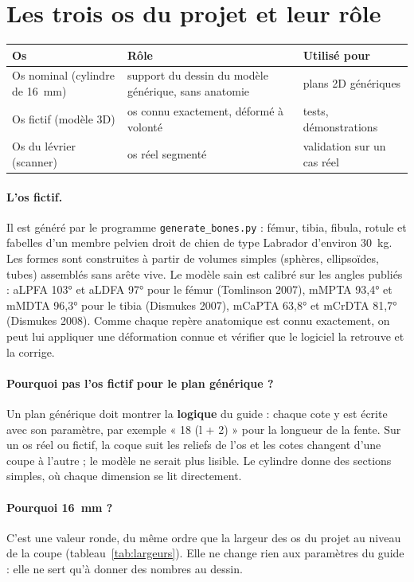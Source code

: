 \documentclass[11pt,a4paper]{article}
\begin{document}
\section{Les trois os du projet et leur rôle}

\begin{tabularx}{\textwidth}{@{}lXl@{}}
\toprule
\textbf{Os} & \textbf{Rôle} & \textbf{Utilisé pour} \\ \midrule
Os nominal (cylindre de 16~mm) & support du dessin du modèle générique, sans anatomie & plans 2D génériques \\
Os fictif (modèle 3D) & os connu exactement, déformé à volonté & tests, démonstrations \\
Os du lévrier (scanner) & os réel segmenté & validation sur un cas réel \\
\bottomrule
\end{tabularx}

\paragraph{L'os fictif.} Il est généré par le programme \texttt{generate\_bones.py} : fémur, tibia, fibula, rotule et
fabelles d'un membre pelvien droit de chien de type Labrador d'environ 30~kg. Les formes sont construites à partir de
volumes simples (sphères, ellipsoïdes, tubes) assemblés sans arête vive. Le modèle sain est calibré sur les angles
publiés : aLPFA 103° et aLDFA 97° pour le fémur (Tomlinson 2007), mMPTA 93,4° et mMDTA 96,3° pour le tibia (Dismukes
2007), mCaPTA 63,8° et mCrDTA 81,7° (Dismukes 2008). Comme chaque repère anatomique est connu exactement, on peut
lui appliquer une déformation connue et vérifier que le logiciel la retrouve et la corrige.

\paragraph{Pourquoi pas l'os fictif pour le plan générique ?} Un plan générique doit montrer la \textbf{logique} du
guide : chaque cote y est écrite avec son paramètre, par exemple « 18 (l + 2) » pour la longueur de la fente. Sur un
os réel ou fictif, la coque suit les reliefs de l'os et les cotes changent d'une coupe à l'autre ; le modèle ne serait
plus lisible. Le cylindre donne des sections simples, où chaque dimension se lit directement.

\paragraph{Pourquoi 16~mm ?} C'est une valeur ronde, du même ordre que la largeur des os du projet au niveau de la
coupe (tableau~\ref{tab:largeurs}). Elle ne change rien aux paramètres du guide : elle ne sert qu'à donner des
nombres au dessin.
\end{document}
